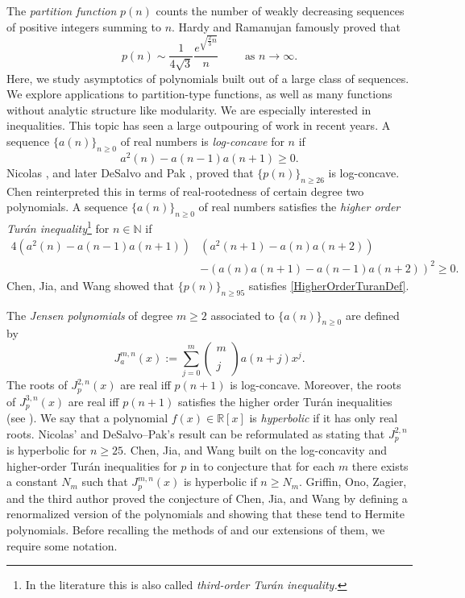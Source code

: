 \documentclass[11pt,reqno,a4paper]{amsart}
\newcommand{\N}{\mathbb{N}}
\newcommand{\R}{\mathbb{R}}
\renewcommand{\(}{\left\(}
\renewcommand{\)}{\right\)}
\numberwithin{equation}{section}
\theoremstyle{plain}
\theoremstyle{definition} %
\numberwithin{equation}{section}
\renewcommand{\binom}[2]{\left(\begin{smallmatrix}#1\\\\#2\end{smallmatrix}\right)}
\begin{document}
The {\it partition function} $p(n)$ counts the number of weakly decreasing sequences of positive integers summing to $n$. Hardy and Ramanujan \cite{HR} famously proved that
\begin{equation}\label{pnasymp} 
 p(n)\sim \frac{1}{4\sqrt{3}}\frac{e^{\sqrt{\frac{2}3 n}}}{n}\quad\quad \text{ as }n\rightarrow\infty.
 \end{equation}
 Here, we study asymptotics of polynomials built out of a large class of sequences. We explore applications to partition-type functions, as well as many functions without analytic structure like modularity. 
We are especially interested in inequalities. This topic has seen a large outpouring of work in recent years. A sequence $\{a(n)\}_{n\ge 0}$ of real numbers is {\it log-concave} for $n$ if
\begin{equation}\label{log-concave}
a^2(n)-a(n-1)a(n+1)\geq0.
\end{equation}
  Nicolas \cite{Nicolas}, and later DeSalvo and Pak \cite{DP15}, proved that $\{p(n)\}_{n\ge 26}$ is log-concave. Chen \cite{Chen1} reinterpreted this in terms of real-rootedness of certain degree two polynomials. 
  A sequence $\{a(n)\}_{n\ge 0}$ of real numbers satisfies the {\it higher order Tur\'{a}n inequality}\footnote{In the literature this is also called {\it third-order Tur\'{a}n inequality.}} for $n\in\N$ if
  \begin{equation}\label{HigherOrderTuranDef}
  \begin{aligned}
  4\left(a^2(n)-a(n-1)a(n+1)\right)&\left(a^2(n+1)-a(n)a(n+2)\right)\\
  &-\left(a(n)a(n+1)-a(n-1)a(n+2)\right)^2\geq 0.
  \end{aligned}
  \end{equation} 
Chen, Jia, and Wang \cite[Theorem 1.4]{Chen2} showed that $\{p(n)\}_{n\ge 95}$ satisfies \eqref{HigherOrderTuranDef}.  
 
The {\it Jensen polynomials} of degree $m\ge 2$ associated to $\{a(n)\}_{n\ge 0}$ are defined by
\begin{equation}\label{Jensendef}
J^{m,n}_a(x):=\sum_{j=0}^{m}\binom{m}{j}a(n+j)x^j.
\end{equation}
 The roots of $J^{2,n}_p(x)$ are real iff $p(n+1)$ is log-concave. Moreover, the roots of $J^{3,n}_p(x)$ are real iff $p(n+1)$ satisfies the higher order Tur\'an inequalities (see \cite{Chen2}). We say that a polynomial $f(x)\in\R[x]$ is {\it hyperbolic} if it has only real roots. Nicolas' and DeSalvo--Pak's result can be reformulated as stating that $J^{2,n}_p$ is hyperbolic for  $n\geq25$. Chen, Jia, and Wang built on the log-concavity and higher-order Tur\'an inequalities for $p$ in \cite[Conjecture 1.5]{Chen2} to conjecture that for each $m$ there exists a constant $N_m$ such that $J^{m,n}_p(x)$ is hyperbolic if $n\geq N_m$. Griffin, Ono, Zagier, and the third author \cite[Theorem 5]{GORZ} proved the conjecture of Chen, Jia, and Wang by defining a renormalized version of the polynomials and showing that these tend to Hermite polynomials.  Before recalling the methods of \cite{GORZ} and our extensions of them, we require some notation. 
\end{document}
